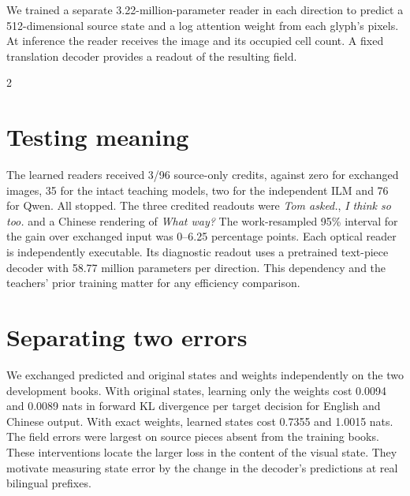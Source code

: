 \newpage
{}
\noindent We trained a separate 3.22-million-parameter reader in each direction to predict a 512-dimensional source state and a log attention weight from each glyph's pixels. At inference the reader receives the image and its occupied cell count. A fixed translation decoder provides a readout of the resulting field.
\begin{multicols}{2}
\section*{Testing meaning}
The learned readers received 3/96 source-only credits, against zero for exchanged images, 35 for the intact teaching models, two for the independent ILM and 76 for Qwen. All stopped. The three credited readouts were \emph{Tom asked.}, \emph{I think so too.} and a Chinese rendering of \emph{What way?} The work-resampled 95\% interval for the gain over exchanged input was 0--6.25 percentage points. Each optical reader is independently executable. Its diagnostic readout uses a pretrained text-piece decoder with 58.77 million parameters per direction. This dependency and the teachers' prior training matter for any efficiency comparison.
\section*{Separating two errors}
We exchanged predicted and original states and weights independently on the two development books. With original states, learning only the weights cost 0.0094 and 0.0089 nats in forward KL divergence per target decision for English and Chinese output. With exact weights, learned states cost 0.7355 and 1.0015 nats. The field errors were largest on source pieces absent from the training books. These interventions locate the larger loss in the content of the visual state. They motivate measuring state error by the change in the decoder's predictions at real bilingual prefixes.
\end{multicols}
